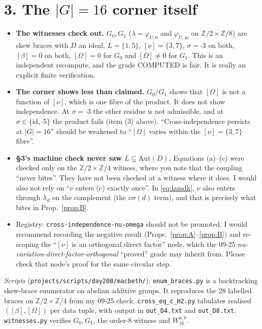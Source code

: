 \documentclass[11pt]{article}
\theoremstyle{remark}
\newcommand{\Z}{\mathbb Z}
\newcommand{\Aut}{\mathrm{Aut}}
\begin{document}
\section*{3. The $|G|=16$ corner itself}
\begin{itemize}
\item \textbf{The witnesses check out.} $G_0,G_1$ ($\lambda=\varphi_{U,0}$ and $\varphi_{U,4i}$ on $\Z/2\times\Z/8$) are skew braces
  with $D$ an ideal, $L=\{1,5\}$, $[\nu]=\{3,7\}$, $\sigma=\cdot3$ on both, $[\beta]=0$ on both, $[\Omega]=0$ for $G_0$ and
  $[\Omega]\ne0$ for $G_1$. This is an independent recompute, and the grade COMPUTED is fair. It is really an explicit finite verification.
\item \textbf{The corner shows less than claimed.} $G_0/G_1$ shows that $[\Omega]$ is not a function of $[\nu]$, which is one
  fibre of the product. It does not show independence. At $\sigma=\cdot3$ the other residue is not admissible,
  and at $\sigma\in\{\mathrm{id},\cdot5\}$ the product fails (item (3) above). ``Cross-independence persists at $|G|=16$''
  should be weakened to ``$[\Omega]$ varies within the $[\nu]=\{3,7\}$ fibre''.
\item \textbf{\S3's machine check never saw $L\subsetneq\Aut(D)$.} Equations (a)--(c) were checked only on the $\Z/2\times\Z/4$
  witness, where you note that the coupling ``never bites''. They have not been checked at a witness where it does. I would also not
  rely on ``$\nu$ enters (c) exactly once''. In \eqref{eq:lamdk}, $\nu$ also enters through $\lambda_d$ on the complement
  (the $\nu\sigma(d)$ term), and that is precisely what bites in Prop.~\ref{prop:B}.
\item Registry: \texttt{cross-independence-nu-omega} should not be promoted. I would recommend recording the negative result
  (Props.~\ref{prop:A}--\ref{prop:B}) and re-scoping the ``$[\nu]$ is an orthogonal direct factor'' node, which the
  09-25 \emph{nu-variation-direct-factor-orthogonal} ``proved'' grade may inherit from. Please check that node's proof for the same
  circular step.
\end{itemize}

\noindent\emph{Scripts} (\texttt{projects/scripts/day208/macbeth/}): \texttt{enum\_braces.py} is a backtracking skew-brace
enumerator on abelian additive groups. It reproduces the 28 labelled braces on $\Z/2\times\Z/4$ from my 09-25 check. \texttt{cross\_eq\_c\_H2.py} tabulates realised
$([\beta],[\Omega])$ per data tuple, with output in \texttt{out\_D4.txt} and \texttt{out\_D8.txt}. \texttt{witnesses.py} verifies $G_0,G_1$, the
order-8 witness and $W^{a,b}_{16}$.
\end{document}
